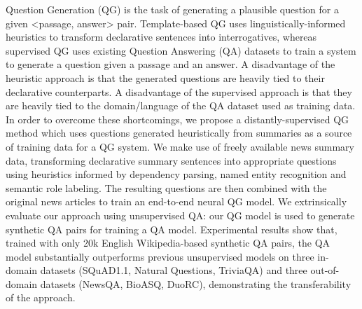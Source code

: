 Question Generation (QG) is the task of generating a plausible question for a given <passage, answer> pair. Template-based QG uses linguistically-informed heuristics to transform declarative sentences into interrogatives, whereas supervised QG uses existing Question Answering (QA) datasets to train a system to generate a question given a passage and an answer. A disadvantage of the heuristic approach is that the generated questions are heavily tied to their declarative counterparts. A disadvantage of the supervised approach is that they are heavily tied to the domain/language of the QA dataset used as training data. In order to overcome these shortcomings, we propose a distantly-supervised QG method which uses questions generated heuristically from summaries as a source of training data for a  QG system. We make use of freely available news summary data, transforming declarative summary sentences into appropriate questions using heuristics informed by dependency parsing, named entity recognition and semantic role labeling. The resulting questions are then combined with the original news articles to train an end-to-end neural QG model. We extrinsically evaluate our approach using unsupervised QA: our QG model is used to  generate synthetic QA pairs for training a QA model. Experimental results show that, trained with only 20k English Wikipedia-based synthetic QA pairs, the QA model substantially outperforms previous unsupervised models on three in-domain datasets (SQuAD1.1, Natural Questions, TriviaQA) and three out-of-domain datasets (NewsQA, BioASQ, DuoRC), demonstrating the transferability of the approach.
